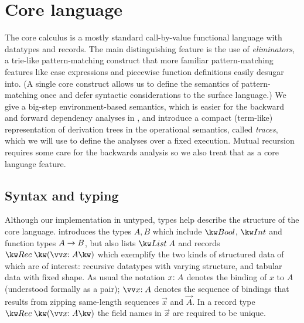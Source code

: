 \section{Core language}
\label{sec:core-language}

The core calculus is a mostly standard call-by-value functional language with datatypes and records. The main distinguishing feature is the use of \emph{eliminators}, a trie-like pattern-matching construct that more familiar pattern-matching features like case expressions and piecewise function definitions easily desugar into. (A single core construct allows us to define the semantics of pattern-matching once and defer syntactic considerations to the surface language.) We give a big-step environment-based semantics, which is easier for the backward and forward dependency analyses in , and introduce a compact (term-like) representation of derivation trees in the operational semantics, called \emph{traces}, which we will use to define the analyses over a fixed execution. Mutual recursion requires some care for the backwards analysis so we also treat that as a core language feature.

\subsection{Syntax and typing}
\label{sec:core-language:syntax-typing}

Although our implementation in untyped, types help describe the structure of the core language.  introduces the types $A, B$ which include $\tyBool$, $\tyInt$ and function types ${A}\rightarrow{B}$, but also lists $\tyList{A}$ and records $\tyRec{\vec{\bind{x}{A}}}$ which exemplify the two kinds of structured data of which are of interest: recursive datatypes with varying structure, and tabular data with fixed shape. As usual the notation $x{:}\;A$ denotes the binding of $x$ to $A$ (understood formally as a pair); $\seq{\bind{x}{A}}$ denotes the sequence of bindings that results from zipping same-length sequences $\vec{x}$ and $\vec{A}$. In a record type $\tyRec{\vec{\bind{x}{A}}}$ the field names in $\vec{x}$ are required to be unique.



